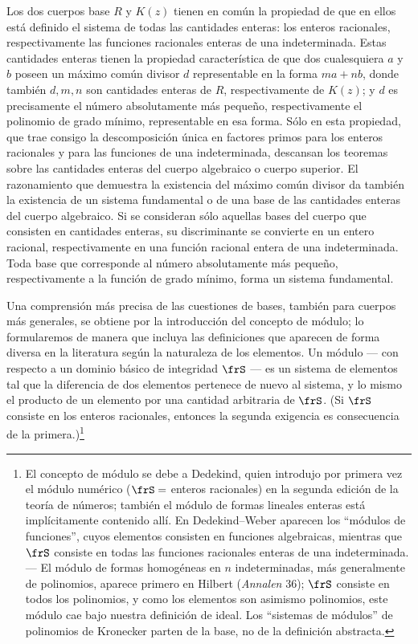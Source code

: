 \documentclass[11pt]{article}
\begin{document}
Los dos cuerpos base \(R\) y \(K(z)\) tienen en común la propiedad de que en ellos está definido el sistema de todas las cantidades enteras: los enteros racionales, respectivamente las funciones racionales enteras de una indeterminada. Estas cantidades enteras tienen la propiedad característica de que dos cualesquiera \(a\) y \(b\) poseen un máximo común divisor \(d\) representable en la forma \(ma+nb\), donde también \(d,m,n\) son cantidades enteras de \(R\), respectivamente de \(K(z)\); y \(d\) es precisamente el número absolutamente más pequeño, respectivamente el polinomio de grado mínimo, representable en esa forma. Sólo en esta propiedad, que trae consigo la descomposición única en factores primos para los enteros racionales y para las funciones de una indeterminada, descansan los teoremas sobre las cantidades enteras del cuerpo algebraico o cuerpo superior. El razonamiento que demuestra la existencia del máximo común divisor da también la existencia de un sistema fundamental o de una base de las cantidades enteras del cuerpo algebraico. Si se consideran sólo aquellas bases del cuerpo que consisten en cantidades enteras, su discriminante se convierte en un entero racional, respectivamente en una función racional entera de una indeterminada. Toda base que corresponde al número absolutamente más pequeño, respectivamente a la función de grado mínimo, forma un sistema fundamental.

Una comprensión más precisa de las cuestiones de bases, también para cuerpos más generales, se obtiene por la introducción del concepto de módulo; lo formularemos de manera que incluya las definiciones que aparecen de forma diversa en la literatura según la naturaleza de los elementos. Un módulo --- con respecto a un dominio básico de integridad \(\frS\) --- es un sistema de elementos tal que la diferencia de dos elementos pertenece de nuevo al sistema, y lo mismo el producto de un elemento por una cantidad arbitraria de \(\frS\). (Si \(\frS\) consiste en los enteros racionales, entonces la segunda exigencia es consecuencia de la primera.)\footnote{El concepto de módulo se debe a Dedekind, quien introdujo por primera vez el módulo numérico (\(\frS=\) enteros racionales) en la segunda edición de la teoría de números; también el módulo de formas lineales enteras está implícitamente contenido allí. En Dedekind--Weber aparecen los ``módulos de funciones'', cuyos elementos consisten en funciones algebraicas, mientras que \(\frS\) consiste en todas las funciones racionales enteras de una indeterminada. --- El módulo de formas homogéneas en \(n\) indeterminadas, más generalmente de polinomios, aparece primero en Hilbert (\emph{Annalen} 36); \(\frS\) consiste en todos los polinomios, y como los elementos son asimismo polinomios, este módulo cae bajo nuestra definición de ideal. Los ``sistemas de módulos'' de polinomios de Kronecker parten de la base, no de la definición abstracta.}
\end{document}
